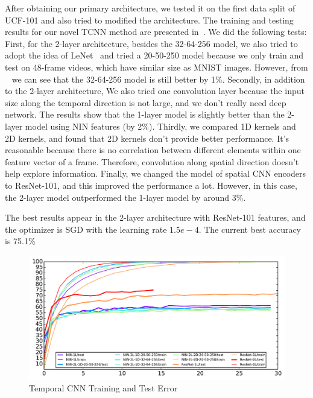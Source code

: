 After obtaining our primary architecture, we tested it on the first data split of UCF-101 and also tried to modified the architecture. The training and testing results for our novel TCNN method are presented in~. We did the following tests: First, for the 2-layer architecture, besides the 32-64-256 model, we also tried to adopt the idea of 
LeNet~\cite{lenet} and tried a 20-50-250 model because we only train and test on 48-frame videos, which have similar size as MNIST images. However, from ~ we can see that the 32-64-256 model is still better by 1\%. Secondly, in addition to the 2-layer architecture, We also tried one convolution layer because the input size along the temporal direction is not large, and we don't really need deep network. The results show that the 1-layer model is slightly better than the 2-layer model using NIN features (by 2\%). Thirdly, we compared 1D kernels and 2D kernels, and found that 2D kernels don't provide better performance. It's reasonable because there is no correlation between different elements within one feature vector of a frame. Therefore, convolution along spatial direction doesn't help explore information. Finally, we changed the model of spatial CNN encoders to ResNet-101, and this improved the performance a lot. However, in this case, the 2-layer model outperformed the 1-layer model by around 3\%. 

The best results appear in the 2-layer architecture with ResNet-101 features, and the optimizer is SGD with the learning rate $1.5e-4$. The current best accuracy is 75.1\%

\begin{figure}
  \centering
  \includegraphics[width=1.0\linewidth]{figs/TCNNout}
  \caption{Temporal CNN Training and Test Error}
  \label{fig:tnntest}
\end{figure}

